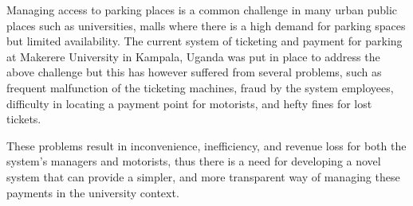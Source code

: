 Managing access to parking places is a common challenge in many urban public places such as universities, malls where there is a high demand for parking spaces but limited availability\cite{parmar_study_2020}.
The current system of ticketing and payment for parking at Makerere University in Kampala, Uganda was put in place to address the above challenge but this has however suffered from several problems, such as frequent malfunction of the ticketing machines, fraud by the system employees, difficulty in locating a payment point for motorists, and hefty fines for lost tickets.

These problems result in inconvenience, inefficiency, and revenue loss for both the system’s managers and motorists, thus there is a need for developing a novel system that can provide a simpler, and more transparent way of managing these payments in the university context.

